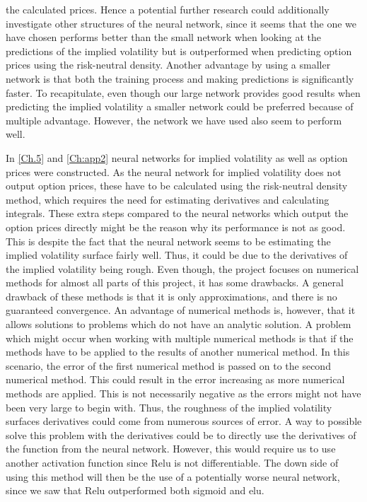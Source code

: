 the calculated prices. Hence a potential further research could additionally investigate other structures of the neural network, since it seems that the one we have chosen performs better than the small network when looking at the predictions of the implied volatility but is outperformed when predicting option prices using the risk-neutral density. Another advantage by using a smaller network is that both the training process and making predictions is significantly faster. To recapitulate, even though our large network provides good results when predicting the implied volatility a smaller network could be preferred because of multiple advantage. However, the network we have used also seem to perform well.

In \autoref{Ch.5} and \autoref{Ch:app2} neural networks for implied volatility as well as option prices were constructed. As the neural network for implied volatility does not output option prices, these have to be calculated using the risk-neutral density method, which requires the need for estimating derivatives and calculating integrals. These extra steps compared to the neural networks which output the option prices directly might be the reason why its performance is not as good. This is despite the fact that the neural network seems to be estimating the implied volatility surface fairly well. Thus, it could be due to the derivatives of the implied volatility being rough. Even though, the project focuses on numerical methods for almost all parts of this project, it has some drawbacks. A general drawback of these methods is that it is only approximations, and there is no guaranteed convergence. An advantage of numerical methods is, however, that it allows solutions to problems which do not have an analytic solution. A problem which might occur when working with multiple numerical methods is that if the methods have to be applied to the results of another numerical method. In this scenario, the error of the first numerical method is passed on to the second numerical method. This could result in the error increasing as more numerical methods are applied. This is not necessarily negative as the errors might not have been very large to begin with. Thus, the roughness of the implied volatility surfaces derivatives could come from numerous sources of error. A way to possible solve this problem with the derivatives could be to directly use the derivatives of the function from the neural network. However, this would require us to use another activation function since Relu is not differentiable. The down side of using this method will then be the use of a potentially worse neural network, since we saw that Relu outperformed both sigmoid and elu. 


